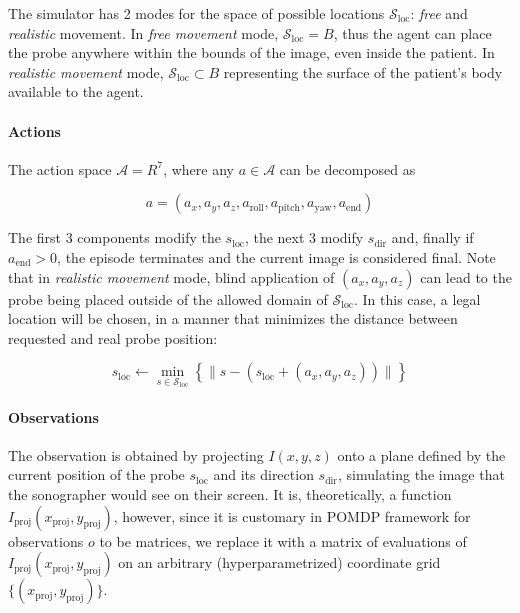 The simulator has 2 modes for the space of possible locations $\mathcal{S}_\text{loc}$: \emph{free} and \emph{realistic} movement.
In \emph{free movement} mode, $\mathcal{S}_\text{loc} = B$, thus the agent can place the probe anywhere within the bounds of the image, even inside the patient.
In \emph{realistic movement} mode, $\mathcal{S}_\text{loc} \subset B$ representing the surface of the patient's body available to the agent.

\paragraph{Actions}

The action space $\mathcal{A} = R^{7}$, where any $a \in \mathcal{A}$ can be decomposed as

\begin{equation}
    a = (a_{x} , a_{y} , a_{z} , a_\text{roll} , a_\text{pitch} , a_\text{yaw}, a_\text{end})
\end{equation}

The first 3 components modify the $s_\text{loc}$, the next 3 modify $s_\text{dir}$ and, finally if $a_\text{end} > 0$, the episode terminates and the current image is considered final.
Note that in \emph{realistic movement} mode, blind application of $(a_{x} , a_{y} , a_{z})$ can lead to the probe being placed outside of the allowed domain of $\mathcal{S}_\text{loc}$.
In this case, a legal location will be chosen, in a manner that minimizes the distance between requested and real probe position:

\begin{equation}
    s_\text{loc} \leftarrow \min_{s \in \mathcal{S}_\text{loc}} \left\{ \lVert s - (s_\text{loc} + (a_{x} , a_{y} , a_{z})) \rVert \right\}
\end{equation}

\paragraph{Observations}

The observation is obtained by projecting $I(x,y,z)$ onto a plane defined by the current position of the probe $s_\text{loc}$ and its direction $s_\text{dir}$, simulating the image that the sonographer would see on their screen.
It is, theoretically, a function $I_\text{proj}(x_\text{proj}, y_\text{proj})$, however, since it is customary in POMDP framework for observations $o$ to be matrices, we replace it with a matrix of evaluations of $I_\text{proj}(x_\text{proj}, y_\text{proj})$ on an arbitrary (hyperparametrized) coordinate grid $\{(x_\text{proj}, y_\text{proj})\}$.

